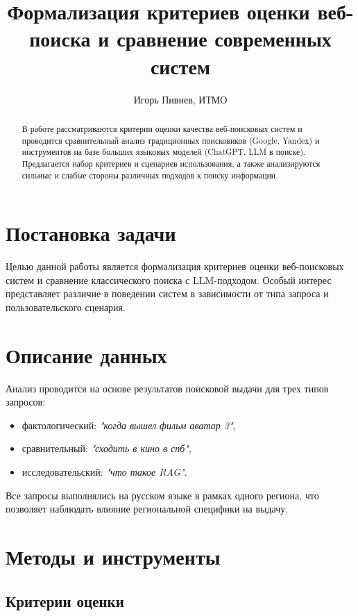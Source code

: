 \documentclass[11pt]{article}
\title{Формализация критериев оценки веб-поиска и сравнение современных систем}
\author{Игорь Пивнев, ИТМО}
\begin{document}
\maketitle

\begin{abstract}
В работе рассматриваются критерии оценки качества веб-поисковых систем и проводится
сравнительный анализ традиционных поисковиков (Google, Yandex) и инструментов на
базе больших языковых моделей (ChatGPT, LLM в поиске). Предлагается набор критериев
и сценариев использования, а также анализируются сильные и слабые стороны различных
подходов к поиску информации.
\end{abstract}

\section{Постановка задачи}

Целью данной работы является формализация критериев оценки веб-поисковых систем
и сравнение классического поиска с LLM-подходом. Особый интерес представляет различие
в поведении систем в зависимости от типа запроса и пользовательского сценария.

\section{Описание данных}

Анализ проводится на основе результатов поисковой выдачи для трех типов запросов:

\begin{itemize}
    \item фактологический: \textit{"когда вышел фильм аватар 3"},
    \item сравнительный: \textit{"сходить в кино в спб"},
    \item исследовательский: \textit{"что такое RAG"}.
\end{itemize}

Все запросы выполнялись на русском языке в рамках одного региона, что позволяет
наблюдать влияние региональной специфики на выдачу.

\section{Методы и инструменты}

\subsection{Критерии оценки}
\end{document}
